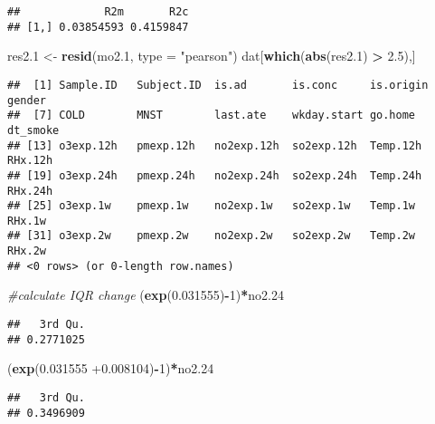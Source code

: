 \documentclass[12pt,]{article}
\newenvironment{Shaded}{\begin{snugshade}}{\end{snugshade}}
\newcommand{\CommentTok}[1]{\textcolor[rgb]{0.56,0.35,0.01}{\textit{#1}}}
\newcommand{\DataTypeTok}[1]{\textcolor[rgb]{0.13,0.29,0.53}{#1}}
\newcommand{\DecValTok}[1]{\textcolor[rgb]{0.00,0.00,0.81}{#1}}
\newcommand{\FloatTok}[1]{\textcolor[rgb]{0.00,0.00,0.81}{#1}}
\newcommand{\KeywordTok}[1]{\textcolor[rgb]{0.13,0.29,0.53}{\textbf{#1}}}
\newcommand{\NormalTok}[1]{#1}
\newcommand{\OperatorTok}[1]{\textcolor[rgb]{0.81,0.36,0.00}{\textbf{#1}}}
\newcommand{\StringTok}[1]{\textcolor[rgb]{0.31,0.60,0.02}{#1}}
\begin{document}
\begin{verbatim}
##             R2m       R2c
## [1,] 0.03854593 0.4159847
\end{verbatim}

\begin{Shaded}
\begin{Highlighting}[]
\NormalTok{res2}\FloatTok{.1}\NormalTok{ <-}\StringTok{ }\KeywordTok{resid}\NormalTok{(mo2}\FloatTok{.1}\NormalTok{, }\DataTypeTok{type =} \StringTok{"pearson"}\NormalTok{)}
\NormalTok{dat[}\KeywordTok{which}\NormalTok{(}\KeywordTok{abs}\NormalTok{(res2}\FloatTok{.1}\NormalTok{) }\OperatorTok{>}\StringTok{ }\FloatTok{2.5}\NormalTok{),]}
\end{Highlighting}
\end{Shaded}

\begin{verbatim}
##  [1] Sample.ID   Subject.ID  is.ad       is.conc     is.origin   gender     
##  [7] COLD        MNST        last.ate    wkday.start go.home     dt_smoke   
## [13] o3exp.12h   pmexp.12h   no2exp.12h  so2exp.12h  Temp.12h    RHx.12h    
## [19] o3exp.24h   pmexp.24h   no2exp.24h  so2exp.24h  Temp.24h    RHx.24h    
## [25] o3exp.1w    pmexp.1w    no2exp.1w   so2exp.1w   Temp.1w     RHx.1w     
## [31] o3exp.2w    pmexp.2w    no2exp.2w   so2exp.2w   Temp.2w     RHx.2w     
## <0 rows> (or 0-length row.names)
\end{verbatim}

\begin{Shaded}
\begin{Highlighting}[]
\CommentTok{#calculate IQR change}
\NormalTok{(}\KeywordTok{exp}\NormalTok{(}\FloatTok{0.031555}\NormalTok{)}\OperatorTok{-}\DecValTok{1}\NormalTok{)}\OperatorTok{*}\NormalTok{no2}\FloatTok{.24}
\end{Highlighting}
\end{Shaded}

\begin{verbatim}
##   3rd Qu. 
## 0.2771025
\end{verbatim}

\begin{Shaded}
\begin{Highlighting}[]
\NormalTok{(}\KeywordTok{exp}\NormalTok{(}\FloatTok{0.031555} \FloatTok{+0.008104}\NormalTok{)}\OperatorTok{-}\DecValTok{1}\NormalTok{)}\OperatorTok{*}\NormalTok{no2}\FloatTok{.24}
\end{Highlighting}
\end{Shaded}

\begin{verbatim}
##   3rd Qu. 
## 0.3496909
\end{verbatim}
\end{document}
